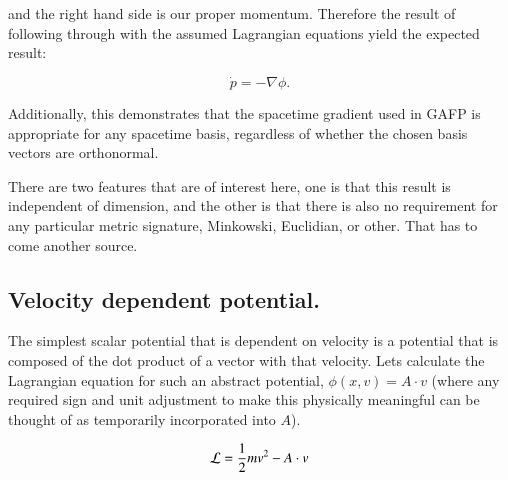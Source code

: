 \documentclass{article}
\newcommand{\grad}[0] {\nabla}
\begin{document}
and the right hand side is our proper momentum.  Therefore the result of following through with the assumed Lagrangian equations yield the expected result:

\begin{equation}
\dot{p} = -\grad \phi.
\end{equation}

Additionally, this demonstrates that the spacetime gradient used in GAFP is appropriate for any spacetime basis, regardless of whether the chosen basis vectors are orthonormal.

There are two features that are of interest here, one is that this result is independent of dimension, and the other is that there is also no requirement for any particular metric signature, Minkowski, Euclidian, or other.  That has to come another source.

\subsection{ Velocity dependent potential. }

The simplest scalar potential that is dependent on velocity is a potential that is composed of the dot product of a vector with that velocity.  Lets calculate the Lagrangian
equation for such an abstract potential, $\phi(x,v) = A \cdot v$ (where any required sign and unit adjustment to make this physically meaningful can be thought of as temporarily incorporated into $A$).

\begin{equation}
\mathcal{L} = \frac{1}{2}m v^2 -A \cdot v
\end{equation}
\end{document}
